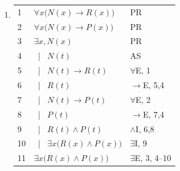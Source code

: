 \documentclass{article}
\newcommand{\asbar}{\ | \ }
\begin{document}
\begin{enumerate}
    \item %
          \begin{tabular}{l|p{8cm}l}
              \hline
              1  & $\forall x\big(N(x)\to R(x)\big)$          & PR                   \\
              2  & $\forall x\big(N(x)\to P(x)\big)$          & PR                   \\
              3  & $\exists x,N(x)$                           & PR                   \\
              4  & \asbar $N(t)$                              & AS                   \\
              5  & \asbar $N(t)\to R(t)$                      & $\forall$E, 1        \\
              6  & \asbar $R(t)$                              & $\to$E, 5,4          \\
              7  & \asbar $N(t)\to P(t)$                      & $\forall$E, 2        \\
              8  & \asbar $P(t)$                              & $\to$E, 7,4          \\
              9  & \asbar $R(t)\land P(t)$                    & $\land$I, 6,8        \\
              10 & \asbar $\exists x\big(R(x)\land P(x)\big)$ & $\exists$I, 9        \\
              11 & $\exists x\big(R(x)\land P(x)\big)$        & $\exists$E, 3, 4--10 \\
              \hline
          \end{tabular}

\end{enumerate}
\end{document}
